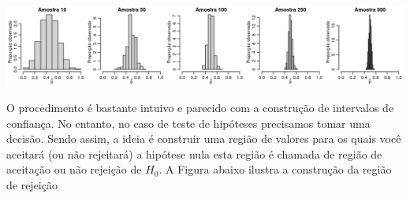 \documentclass[
  10pt,
  a4paper]{book}
\begin{document}
\begin{center}\includegraphics[width=0.99\linewidth]{figures/unnamed-chunk-388-1} \end{center}

O procedimento é bastante intuivo e parecido com a construção de intervalos de confiança. No entanto, no caso de teste de hipóteses precisamos tomar uma decisão. Sendo assim, a ideia é construir uma região de valores para os quais você aceitará (ou não rejeitará) a hipótese nula esta região é chamada de região de aceitação ou não rejeição de \(H_0\).
A Figura abaixo ilustra a construção da região de rejeição
\end{document}
